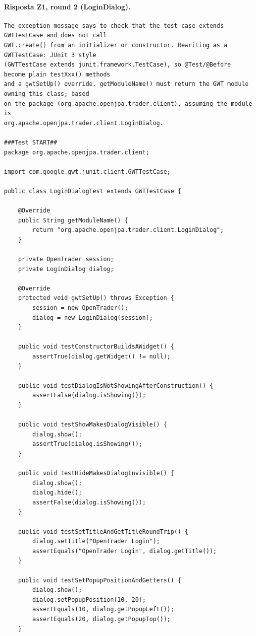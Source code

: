 \paragraph*{Risposta Z1, round 2 (LoginDialog).}
\label{risposta:ld-z1-r2}
\begin{lstlisting}
The exception message says to check that the test case extends GWTTestCase and does not call
GWT.create() from an initializer or constructor. Rewriting as a GWTTestCase: JUnit 3 style
(GWTTestCase extends junit.framework.TestCase), so @Test/@Before become plain testXxx() methods
and a gwtSetUp() override. getModuleName() must return the GWT module owning this class; based
on the package (org.apache.openjpa.trader.client), assuming the module is
org.apache.openjpa.trader.client.LoginDialog.

###Test START##
package org.apache.openjpa.trader.client;

import com.google.gwt.junit.client.GWTTestCase;

public class LoginDialogTest extends GWTTestCase {

    @Override
    public String getModuleName() {
        return "org.apache.openjpa.trader.client.LoginDialog";
    }

    private OpenTrader session;
    private LoginDialog dialog;

    @Override
    protected void gwtSetUp() throws Exception {
        session = new OpenTrader();
        dialog = new LoginDialog(session);
    }

    public void testConstructorBuildsAWidget() {
        assertTrue(dialog.getWidget() != null);
    }

    public void testDialogIsNotShowingAfterConstruction() {
        assertFalse(dialog.isShowing());
    }

    public void testShowMakesDialogVisible() {
        dialog.show();
        assertTrue(dialog.isShowing());
    }

    public void testHideMakesDialogInvisible() {
        dialog.show();
        dialog.hide();
        assertFalse(dialog.isShowing());
    }

    public void testSetTitleAndGetTitleRoundTrip() {
        dialog.setTitle("OpenTrader Login");
        assertEquals("OpenTrader Login", dialog.getTitle());
    }

    public void testSetPopupPositionAndGetters() {
        dialog.show();
        dialog.setPopupPosition(10, 20);
        assertEquals(10, dialog.getPopupLeft());
        assertEquals(20, dialog.getPopupTop());
    }


\end{lstlisting}
